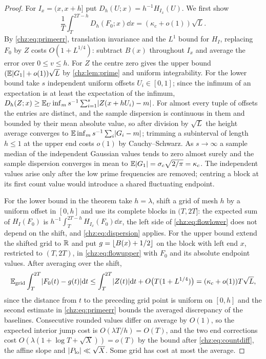 \begin{proof}
For $I_x=(x,x+h]$ put $D_h(U;x)=h^{-1}H_{I_x}(U)$. We first show
\begin{equation}\label{chz:eq:dispersion}
 \frac1T\int_T^{2T-h}D_h(F_0;x)\dd x=(\kappa_c+o(1))\sqrt L .
\end{equation}
By \eqref{chz:eq:primeerr}, translation invariance and the $L^1$ bound for $H_I$, replacing $F_0$ by $Z$ costs
$O(1+L^{1/4})$: subtract $B(x)$ throughout $I_x$ and average the error over $0\le v\le h$. For $Z$ the centre zero
gives the upper bound $(\mathbb{E}\lvert G_1\rvert+o(1))\sqrt L$ by \cref{chz:lem:prime} and uniform integrability. For the
lower bound take $s$ independent uniform offsets $U_i\in[0,1]$; since the infimum of an expectation is at least
the expectation of the infimum,
$D_h(Z;x)\ge\mathbb{E}_U\inf_m s^{-1}\sum_{i=1}^s\lvert Z(x+hU_i)-m\rvert$. For almost every tuple of offsets the entries are
distinct, and the sample dispersion is continuous in them and bounded by their mean absolute value, so after
division by $\sqrt L$ the height average converges to $\mathbb{E}\inf_ms^{-1}\sum_i\lvert G_i-m\rvert$; trimming a subinterval of
length $h\le1$ at the upper end costs $o(1)$ by Cauchy--Schwarz. As $s\to\infty$ a sample median of the
independent Gaussian values tends to zero almost surely and the sample dispersion converges in mean to
$\mathbb{E}\lvert G_1\rvert=\sigma_c\sqrt{2/\pi}=\kappa_c$. The independent values arise only after the low prime frequencies
are removed; centring a block at its first count value would introduce a shared fluctuating endpoint.

For the lower bound in the theorem take $h=\lambda$, shift a grid of mesh $h$ by a uniform offset in $[0,h]$ and use
its complete blocks in $(T,2T]$: the expected sum of $H_I(F_0)$ is $h^{-1}\int_T^{2T-h}H_{I_x}(F_0)\dd x$, the left side
of \eqref{chz:eq:flowlower} does not depend on the shift, and \eqref{chz:eq:dispersion} applies. For the upper bound
extend the shifted grid to $\mathbb{R}$ and put $g=\lfloor B(x)+1/2\rfloor$ on the block with left end $x$, restricted to
$(T,2T)$, in \eqref{chz:eq:flowupper} with $F_0$ and its absolute endpoint values. After averaging over the shift,
\[
 \mathbb{E}_{\mathrm{grid}}\int_T^{2T}\lvert F_0(t)-g(t)\rvert\mathrm{d} t\le\int_T^{2T}\lvert Z(t)\rvert\mathrm{d} t+O\bigl(T(1+L^{1/4})\bigr)=(\kappa_c+o(1))T\sqrt L ,
\]
since the distance from $t$ to the preceding grid point is uniform on $[0,h]$ and the second estimate in
\eqref{chz:eq:primeerr} bounds the averaged discrepancy of the baselines. Consecutive rounded values differ on
average by $O(1)$, so the expected interior jump cost is $O(\lambda T/h)=O(T)$, and the two end corrections cost
$O(\lambda(1+\log T+\sqrt X))=o(T)$ by the bound after \eqref{chz:eq:countdiff}, the affine slope and
$\lvert P_{\mathrm{lo}}\rvert\ll\sqrt X$. Some grid has cost at most the average.
\end{proof}

